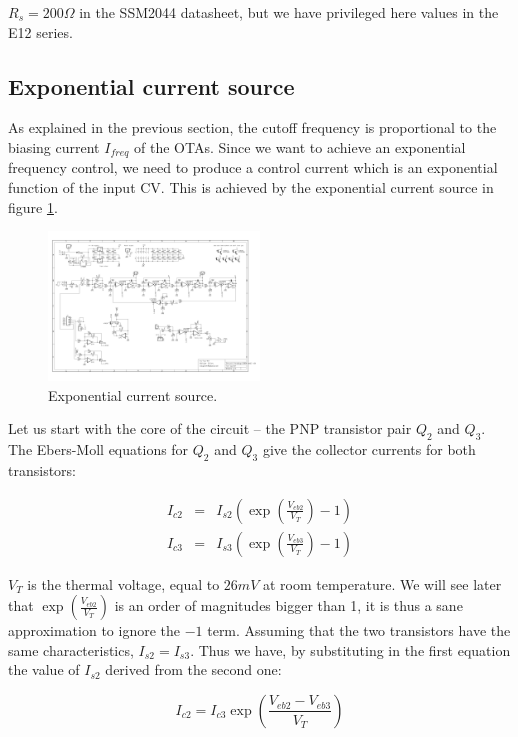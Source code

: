 \documentclass[a4paper,11pt]{article}
\begin{document}
$R_s = 200 \Omega$ in the SSM2044 datasheet, but we have privileged here values in the E12 series.

\subsection{Exponential current source}

As explained in the previous section, the cutoff frequency is proportional to the biasing current $I_{freq}$ of the OTAs. Since we want to achieve an exponential frequency control, we need to produce a control current which is an exponential function of the input CV. This is achieved by the exponential current source in figure \ref{fig:expo}.

\begin{figure}
\centering
\includegraphics[width=0.5\textwidth]{smr4mkII_expo_current_source.pdf}
\caption{Exponential current source.}
\label{fig:expo}
\end{figure}

Let us start with the core of the circuit -- the PNP transistor pair $Q_2$ and $Q_3$. The Ebers-Moll equations for $Q_2$ and $Q_3$ give the collector currents for both transistors:

\begin{eqnarray}
I_{c2} &=& I_{s2} \left(\exp \left( \frac{V_{eb2}}{V_T} \right) - 1 \right) \\
I_{c3} &=& I_{s3} \left(\exp \left( \frac{V_{eb3}}{V_T} \right) - 1 \right)
\end{eqnarray}

$V_T$ is the thermal voltage, equal to $26 mV$ at room temperature. We will see later that $\exp \left( \frac{V_{eb2}}{V_T} \right)$ is an order of magnitudes bigger than 1, it is thus a sane approximation to ignore the $- 1$ term. Assuming that the two transistors have the same characteristics, $I_{s2} = I_{s3}$. Thus we have, by substituting in the first equation the value of $I_{s2}$ derived from the second one:

\begin{equation}
I_{c2} = I_{c3} \exp \left( \frac{V_{eb2} - V_{eb3}}{V_T} \right)
\end{equation}
\end{document}
